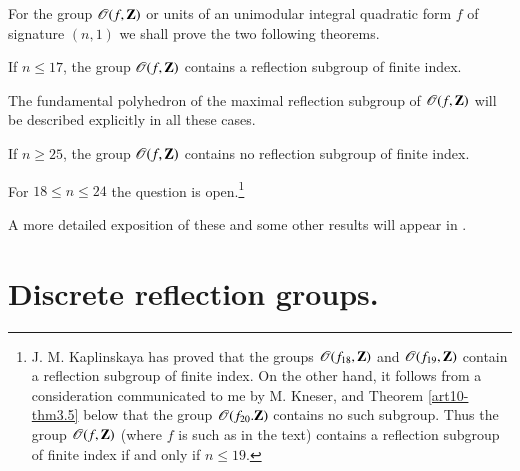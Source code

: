 For the group $\mathscr{O}(f, \mathbf{Z})$ or units of an unimodular integral quadratic form $f$ of signature $(n,1)$ we shall prove the two following theorems. 


\begin{alphtheorem}\label{art10-alphathmA}
If  $n \leqslant 17$, the group $\mathscr{O} (f, \mathbf{Z})$ contains a reflection subgroup of finite index.
\end{alphtheorem}

The fundamental polyhedron of the maximal reflection subgroup of $\mathscr{O} (f, \mathbf{Z})$ will be described explicitly in all these cases.

\begin{alphtheorem}\label{art10-alphathmB}
If $n \geqslant 25$, the group $\mathscr{O} (f, \mathbf{Z})$ contains no reflection subgroup of finite index.
\end{alphtheorem}

For $18 \leqslant n \leqslant 24$ the question is open.\footnote{J. M. Kaplinskaya has proved that the groups $\mathscr{O}(f_{18}, \mathbf{Z})$ and $\mathscr{O} (f_{19}, \mathbf{Z})$ contain a reflection subgroup of finite index. On the other hand, it follows from a consideration communicated to me by M. Kneser, and Theorem \ref{art10-thm3.5} below that the group $\mathscr{O} (f_{20}. \mathbf{Z})$ contains no such subgroup. Thus the group $\mathscr{O} (f, \mathbf{Z})$ (where $f$ is such as in the text) contains a reflection subgroup of finite index if and only if $n \leqslant 19$.}

A more detailed exposition of these and some other results will appear in \cite{art10-key13, art10-key14}.

\section{Discrete reflection groups.}\label{art10-sec1}

